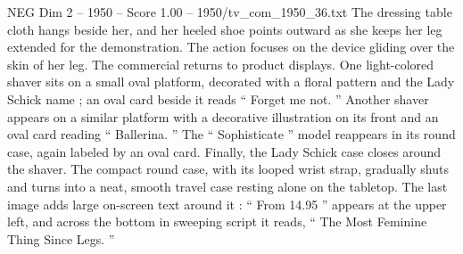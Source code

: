 \begin{textsample}{NEG Dim 2 – 1950 – Score 1.00 – 1950/tv\_com\_1950\_36.txt}
The dressing table cloth hangs beside her, and her heeled shoe points outward as she keeps her leg extended for the demonstration.
The action focuses on the device gliding over the skin of her leg.
The commercial returns to product displays.
One light-colored shaver sits on a small oval platform, decorated with a floral pattern and the Lady Schick name ; an oval card beside it reads “ Forget me not. ” Another shaver appears on a similar platform with a decorative illustration on its front and an oval card reading “ Ballerina. ” The “ Sophisticate ” model reappears in its round case, again labeled by an oval card.
Finally, the Lady Schick case closes around the shaver.
The compact round case, with its looped wrist strap, gradually shuts and turns into a neat, smooth travel case resting alone on the tabletop.
The last image adds large on-screen text around it : “ From 14.95 ” appears at the upper left, and across the bottom in sweeping script it reads, “ The Most Feminine Thing Since Legs. ”

\end{textsample}
